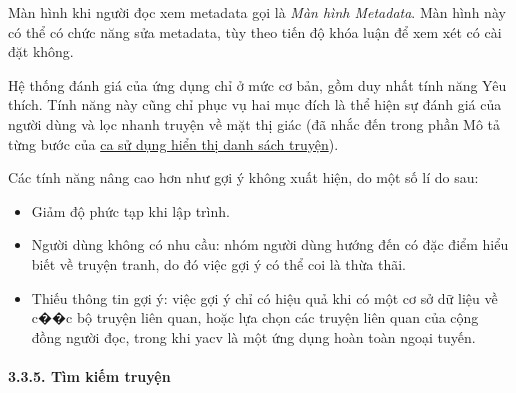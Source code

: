Màn hình khi người đọc xem metadata gọi là \emph{Màn hình Metadata}. Màn
hình này có thể có chức năng sửa metadata, tùy theo tiến độ khóa luận để
xem xét có cài đặt không.

Hệ thống đánh giá của ứng dụng chỉ ở mức cơ bản, gồm duy nhất tính năng
Yêu thích. Tính năng này cũng chỉ phục vụ hai mục đích là thể hiện sự
đánh giá của người dùng và lọc nhanh truyện về mặt thị giác (đã nhắc đến
trong phần Mô tả từng bước của
\protect\hyperlink{P3.3.2-show-library}{ca sử dụng hiển thị danh sách
  truyện}).

Các tính năng nâng cao hơn như gợi ý không xuất hiện, do một số lí do
sau:

\begin{itemize}
  
  \item
        Giảm độ phức tạp khi lập trình.
  \item
        Người dùng không có nhu cầu: nhóm người dùng hướng đến có đặc điểm
        hiểu biết về truyện tranh, do đó việc gợi ý có thể coi là thừa thãi.
  \item
        Thiếu thông tin gợi ý: việc gợi ý chỉ có hiệu quả khi có một cơ sở dữ
        liệu về c��c bộ truyện liên quan, hoặc lựa chọn các truyện liên quan
        của cộng đồng người đọc, trong khi yacv là một ứng dụng hoàn toàn
        ngoại tuyến.
\end{itemize}

\hypertarget{tuxecm-kiux1ebfm-truyux1ec7n}{%
  \paragraph{\texorpdfstring{3.3.5. Tìm kiếm truyện
    }{3.3.5. Tìm kiếm truyện }}\label{tuxecm-kiux1ebfm-truyux1ec7n}}

